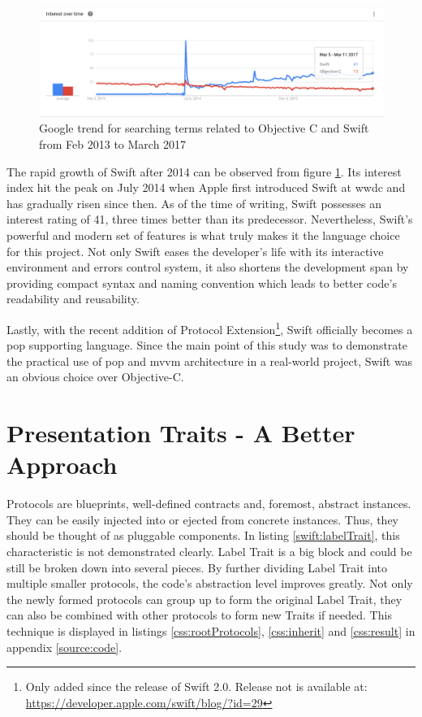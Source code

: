 \documentclass[11pt,a4paper,oneside,article]{memoir}
\begin{document}
\begin{figure}[H]

\centering
\includegraphics[width=\textwidth]{ObjectiveC-vs-Swift-trend}

\caption{Google trend for searching terms related to Objective C and Swift from Feb 2013 to March 2017}
\label{fig:ObjectiveCVsSwiftTrend}

\end{figure}

The rapid growth of Swift after 2014 can be observed from figure \ref{fig:ObjectiveCVsSwiftTrend}. Its interest index hit the peak on July 2014 when Apple first introduced Swift at \gls{wwdc} and has gradually risen since then. As of the time of writing, Swift possesses an interest rating of 41, three times better than its predecessor. Nevertheless, Swift's powerful and modern set of features is what truly makes it the language choice for this project. Not only Swift eases the developer's life with its interactive environment and errors control system, it also shortens the development span by providing compact syntax and naming convention which leads to better code's readability and reusability.\cite{swift:book} 

Lastly, with the recent addition of Protocol Extension\footnote{Only added since the release of Swift 2.0. Release not is available at: \url{https://developer.apple.com/swift/blog/?id=29}}, Swift officially becomes a \gls{pop} supporting language. Since the main point of this study was to demonstrate the practical use of \gls{pop} and \gls{mvvm} architecture in a real-world project, Swift was an obvious choice over Objective-C.

\section{Presentation Traits - A Better Approach}\label{discussion:betterapproach}
Protocols are blueprints, well-defined contracts and, foremost, abstract instances. They can be easily injected into or ejected from concrete instances. Thus, they should be thought of as pluggable components. In listing \ref{swift:labelTrait}, this characteristic is not demonstrated clearly. Label Trait is a big block and could be still be broken down into several pieces. By further dividing Label Trait into multiple smaller protocols, the code's abstraction level improves greatly. Not only the newly formed protocols can group up to form the original Label Trait, they can also be combined with other protocols to form new Traits if needed. This technique is displayed in listings \ref{css:rootProtocols}, \ref{css:inherit} and \ref{css:result} in appendix \ref{source:code}.
\end{document}
